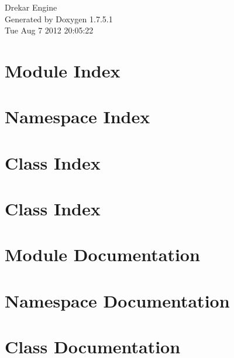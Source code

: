 \documentclass[a4paper]{book}
\begin{document}
\hypersetup{pageanchor=false,citecolor=blue}
\begin{titlepage}
\vspace*{7cm}
\begin{center}
{\Large \-Drekar \-Engine }\\
\vspace*{1cm}
{\large \-Generated by Doxygen 1.7.5.1}\\
\vspace*{0.5cm}
{\small Tue Aug 7 2012 20:05:22}\\
\end{center}
\end{titlepage}
\clearemptydoublepage
{}
\tableofcontents
\clearemptydoublepage
{}
\hypersetup{pageanchor=true,citecolor=blue}
\chapter{\-Module \-Index}

\chapter{\-Namespace \-Index}

\chapter{\-Class \-Index}

\chapter{\-Class \-Index}

\chapter{\-Module \-Documentation}


\chapter{\-Namespace \-Documentation}


\chapter{\-Class \-Documentation}











\printindex
\end{document}
